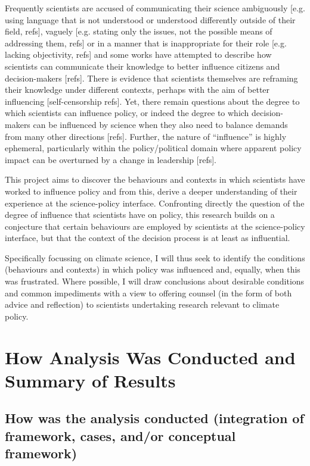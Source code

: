 Frequently scientists are accused of communicating their science ambiguously [e.g. using language that is not understood or understood differently outside of their field, refs], vaguely [e.g. stating only the issues, not the possible means of addressing them, refs] or in a manner that is inappropriate for their role [e.g. lacking objectivity, refs] and some works have attempted to describe how scientists can communicate their knowledge to better influence citizens and decision-makers [refs]. There is evidence that scientists themselves are reframing their knowledge under different contexts, perhaps with the aim of better influencing [self-censorship refs]. Yet, there remain questions about the degree to which scientists can influence policy, or indeed the degree to which decision-makers can be influenced by science when they also need to balance demands from many other directions [refs]. Further, the nature of “influence” is highly ephemeral, particularly within the policy/political domain where apparent policy impact can be overturned by a change in leadership [refs].

This project aims to discover the behaviours and contexts in which scientists have worked to influence policy and from this, derive a deeper understanding of their experience at the science-policy interface. Confronting directly the question of the degree of influence that scientists have on policy, this research builds on a conjecture that certain behaviours are employed by scientists at the science-policy interface, but that the context of the decision process is at least as influential. 

Specifically focussing on climate science, I will thus seek to identify the conditions (behaviours and contexts) in which policy was influenced and, equally, when this was frustrated. Where possible, I will draw conclusions about desirable conditions and common impediments with a view to offering counsel (in the form of both advice and reflection) to scientists undertaking research relevant to climate policy. 

\section{How Analysis Was Conducted and Summary of Results}
\subsection{How was the analysis conducted (integration of framework, cases, and/or conceptual framework)}
